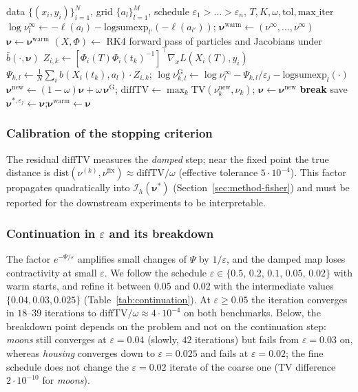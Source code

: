 \documentclass[11pt,leqno]{amsart}
\newcommand{\cI}{\mathcal{I}}
\newcommand{\bnu}{\boldsymbol{\nu}}
\newcommand{\eps}{\varepsilon}
\newcommand{\TV}{\mathrm{TV}}
\numberwithin{equation}{section}
\theoremstyle{definition}
\begin{document}
\begin{algorithm}[ht]
\caption{Explicit solver (damped Gibbs iteration with continuation in $\eps$)}
\label{alg:solver}
\begin{algorithmic}[1]
\Require data $\{(x_i,y_i)\}_{i=1}^N$, grid $\{a_l\}_{l=1}^M$, schedule
$\eps_1>\dots>\eps_n$, $T,K,\omega,\mathrm{tol},\mathrm{max\_iter}$
\State $\log\nu^\infty_l\gets-\ell(a_l)-\mathrm{logsumexp}_{l'}(-\ell(a_{l'}))$;
       \quad $\bnu^{\mathrm{warm}}\gets(\nu^\infty,\dots,\nu^\infty)$
  \State $\bnu\gets\bnu^{\mathrm{warm}}$
    \State $(X,\Phi)\gets$ RK4 forward pass of particles and Jacobians under $\bar b(\cdot,\bnu)$
    \State $Z_{i,k}\gets[\Phi_i(T)\Phi_i(t_k)^{-1}]^\top\nabla_xL(X_i(T),y_i)$
    \State $\Psi_{k,l}\gets\frac1N\sum_i b(X_i(t_k),a_l)\cdot Z_{i,k}$;\quad
           $\log\nu^{\mathrm{G}}_{k,l}\gets\log\nu^\infty_l-\Psi_{k,l}/\eps_j-\mathrm{logsumexp}_l(\cdot)$
    \State $\bnu^{\mathrm{new}}\gets(1-\omega)\bnu+\omega\,\bnu^{\mathrm{G}}$;\quad
           $\mathrm{diffTV}\gets\max_k\TV(\nu^{\mathrm{new}}_k,\nu_k)$;\quad
           $\bnu\gets\bnu^{\mathrm{new}}$
     \textbf{break} \EndIf
  \EndFor
  \State save $\bnu^{*,\eps_j}\gets\bnu$;\quad $\bnu^{\mathrm{warm}}\gets\bnu$
\EndFor
\end{algorithmic}
\end{algorithm}

\subsubsection*{Calibration of the stopping criterion}
The residual $\mathrm{diffTV}$ measures the \emph{damped} step; near the
fixed point the true distance is
$\mathrm{dist}(\nu^{(k)},\nu^{\mathrm{fix}})\approx\mathrm{diffTV}/\omega$
(effective tolerance $5\cdot10^{-4}$).  This factor propagates
quadratically into $\cI_h(\bnu^*)$ (Section~\ref{sec:method-fisher}) and
must be reported for the downstream experiments to be interpretable.

\subsubsection*{Continuation in $\eps$ and its breakdown}
The factor $e^{-\Psi/\eps}$ amplifies small changes of $\Psi$ by $1/\eps$,
and the damped map loses contractivity at small $\eps$.  We follow the
schedule $\eps\in\{0.5,\,0.2,\,0.1,\,0.05,\,0.02\}$ with warm starts, and
refine it between $0.05$ and $0.02$ with the intermediate values
$\{0.04,0.03,0.025\}$ (Table~\ref{tab:continuation}).  At $\eps\ge0.05$ the
iteration converges in $18$--$39$ iterations to
$\mathrm{diffTV}/\omega\approx4\cdot10^{-4}$ on both benchmarks.  Below,
the breakdown point depends on the problem and not on the continuation
step: \emph{moons} still converges at $\eps=0.04$ (slowly, $42$
iterations) but fails from $\eps=0.03$ on, whereas \emph{housing} converges
down to $\eps=0.025$ and fails at $\eps=0.02$; the fine schedule does not
change the $\eps=0.02$ iterate of the coarse one (TV difference
$2\cdot10^{-10}$ for \emph{moons}).
\end{document}
